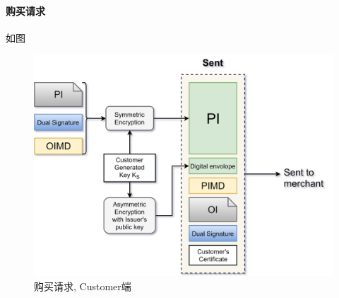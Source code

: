 \documentclass{ctexart}
\begin{document}
\paragraph{购买请求}
    如图
    \begin{figure}[ht!]
    \centering
    \includegraphics[width=\textwidth]{set-1.jpg}
    \caption{购买请求, Customer端}
    \label{set-1}
    \end{figure}
\end{document}
